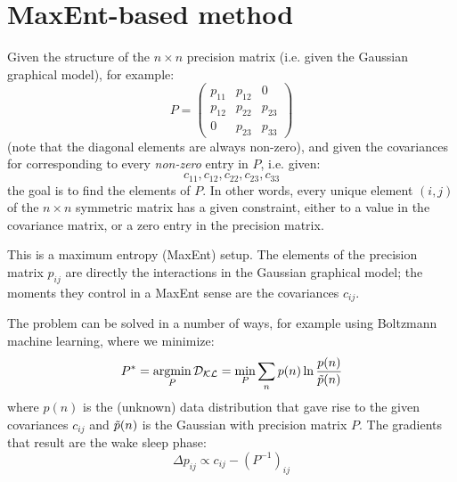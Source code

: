 \documentclass[11pt]{article}
\begin{document}

\section{MaxEnt-based method}


Given the structure of the $n\times n$ precision matrix (i.e. given the Gaussian graphical model), for example:
\begin{equation}
P = \begin{pmatrix}
	p_{11} & p_{12} & 0 \\
	p_{12} & p_{22} & p_{23} \\
	0 & p_{23} & p_{33}
\end{pmatrix}
\end{equation}
(note that the diagonal elements are always non-zero), and given the covariances for corresponding to every \textit{non-zero} entry in $P$, i.e. given:
\begin{equation}
c_{11}, c_{12}, c_{22}, c_{23}, c_{33}
\end{equation}
the goal is to find the elements of $P$. In other words, every unique element $(i,j)$ of the $n\times n$ symmetric matrix has a given constraint, either to a value in the covariance matrix, or a zero entry in the precision matrix.

This is a maximum entropy (MaxEnt) setup. The elements of the precision matrix $p_{ij}$ are directly the interactions in the Gaussian graphical model; the moments they control in a MaxEnt sense are the covariances $c_{ij}$.

The problem can be solved in a number of ways, for example using Boltzmann machine learning, where we minimize:
\begin{equation}
P^* = \underset{P}{\text{argmin}} \, \mathcal{D}_{\mathcal{K}\mathcal{L}} = \underset{P}{\text{min}} \sum_n p(n) \ln \frac{p(n)}{{\tilde{p}}(n)}
\end{equation}
where $p(n)$ is the (unknown) data distribution that gave rise to the given covariances $c_{ij}$ and ${\tilde{p}}(n)$ is the Gaussian with precision matrix $P$. The gradients that result are the wake sleep phase:
\begin{equation}
\Delta p_{ij} \propto c_{ij} - (P^{-1})_{ij}
\end{equation}
\end{document}
